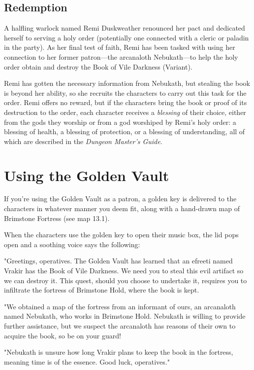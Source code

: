 \documentclass[10pt,a4paper,twoside,bg=print,twocolumn,openany,nodeprecatedcode]{dndbook}
\begin{document}
\subsection{Redemption}
A halfling warlock named Remi Duskweather renounced her pact and dedicated herself to serving a holy order (potentially one connected with a cleric or paladin in the party). As her final test of faith, Remi has been tasked with using her connection to her former patron—the arcanaloth Nebukath—to help the holy order obtain and destroy the Book of Vile Darkness (Variant).

Remi has gotten the necessary information from Nebukath, but stealing the book is beyond her ability, so she recruits the characters to carry out this task for the order. Remi offers no reward, but if the characters bring the book or proof of its destruction to the order, each character receives a \textit{blessing} of their choice, either from the gods they worship or from a god worshiped by Remi's holy order: a blessing of health, a blessing of protection, or a blessing of understanding, all of which are described in the \textit{Dungeon Master's Guide}.

\section{Using the Golden Vault}
If you're using the Golden Vault as a patron, a golden key is delivered to the characters in whatever manner you deem fit, along with a hand-drawn map of Brimstone Fortress (see map 13.1).

When the characters use the golden key to open their music box, the lid pops open and a soothing voice says the following:

\begin{DndReadAloud}{}
"Greetings, operatives. The Golden Vault has learned that an efreeti named Vrakir has the Book of Vile Darkness. We need you to steal this evil artifact so we can destroy it. This quest, should you choose to undertake it, requires you to infiltrate the fortress of Brimstone Hold, where the book is kept.

"We obtained a map of the fortress from an informant of ours, an arcanaloth named Nebukath, who works in Brimstone Hold. Nebukath is willing to provide further assistance, but we suspect the arcanaloth has reasons of their own to acquire the book, so be on your guard!

"Nebukath is unsure how long Vrakir plans to keep the book in the fortress, meaning time is of the essence. Good luck, operatives."

\end{DndReadAloud}
\end{document}
